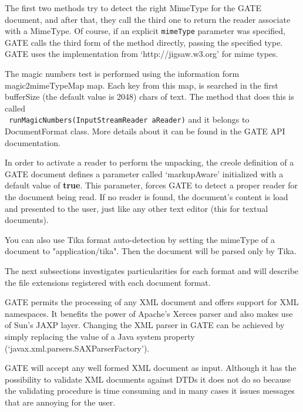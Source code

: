 The first two methods try to detect the right MimeType for the
GATE document, and after that, they call the third one to return
the reader associate with a MimeType. Of course, if an explicit
{\tt mimeType} parameter was specified, GATE calls the third form
of the method directly, passing the specified type. GATE uses the
implementation from `http://jigsaw.w3.org' for mime types.

The magic numbers test is performed using the information form \\
magic2mimeTypeMap map. Each key from this map, is searched in the
first bufferSize (the default value is 2048) chars of text. The
method that does this is called \\ {\tt
runMagicNumbers(InputStreamReader aReader)} and it belongs to
DocumentFormat class. More details about it can be found in the
GATE API documentation.

In order to activate a reader to perform the unpacking, the creole
definition of a GATE document defines a parameter called
`markupAware' initialized with a default value of {\bf true}.
This parameter, forces GATE to detect a proper reader for the
document being read. If no reader is found, the document's content
is load and presented to the user, just like any other text editor
(this for textual documents).

You can also use Tika format auto-detection by setting the mimeType of a
document to "application/tika". Then the document will be parsed only by
Tika.

The next subsections investigates particularities for each format
and will describe the file extensions registered with each
document format.




GATE permits the processing of any XML document and offers support
for XML namespaces. It benefits the power of Apache's Xerces
parser and also makes use of Sun's JAXP layer. Changing the XML
parser in GATE can be achieved by simply replacing the value of a
Java system property (`javax.xml.parsers.SAXParserFactory').

GATE will accept any well formed XML document as input. Although
it has the possibility to validate XML documents against DTDs it
does not do so because the validating procedure is time consuming
and in many cases it issues messages that are annoying for the
user.

